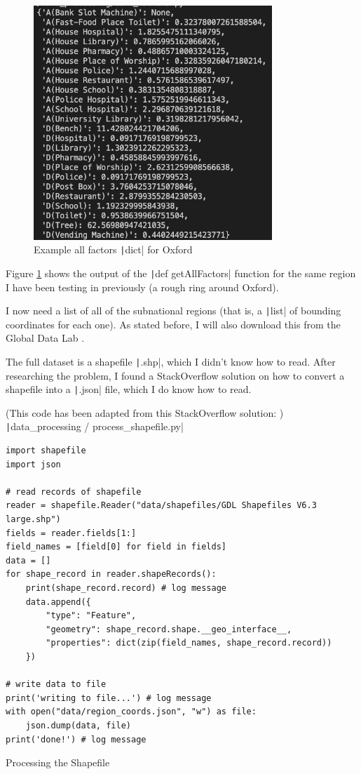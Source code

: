 \documentclass[12pt]{report}
\newcommand{\pil}[1]{\protect\texttt|#1|}
\begin{document}
\begin{figure}[H]
\centering
\includegraphics[width=9cm]{ss5.2.png}
\caption{Example all factors \pil{dict} for Oxford}\label{fig:ss5.2}
\end{figure}

Figure \ref{fig:ss5.2} shows the output of the \pil{def getAllFactors} function for the same region I have been testing in previously (a rough ring around Oxford).

I now need a list of all of the subnational regions (that is, a \pil{list} of bounding coordinates for each one). As stated before, I will also download this from the Global Data Lab \cite{regionBorders}.

The full dataset is a shapefile \pil{.shp}, which I didn't know how to read. After researching the problem, I found a StackOverflow solution \cite{stackOverflowConvertShapefile} on how to convert a shapefile into a \pil{.json} file, which I do know how to read.

\begin{listing}[H]
(This code has been adapted from this StackOverflow solution: \cite{stackOverflowConvertShapefile}) \\
\pil{data_processing / process_shapefile.py}
\begin{verbatim}
import shapefile
import json

# read records of shapefile
reader = shapefile.Reader("data/shapefiles/GDL Shapefiles V6.3 large.shp")
fields = reader.fields[1:]
field_names = [field[0] for field in fields]
data = []
for shape_record in reader.shapeRecords():
    print(shape_record.record) # log message
    data.append({
        "type": "Feature",
        "geometry": shape_record.shape.__geo_interface__,
        "properties": dict(zip(field_names, shape_record.record))
    })

# write data to file
print('writing to file...') # log message
with open("data/region_coords.json", "w") as file:
    json.dump(data, file)
print('done!') # log message
\end{verbatim}
\caption{Processing the Shapefile}\label{cs:processShapefile}
\end{listing}
\end{document}
